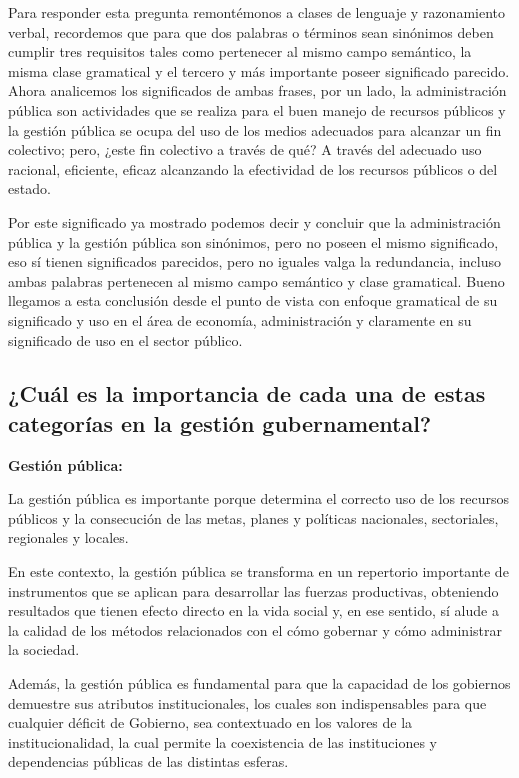 \documentclass[
  letterpaper,
  DIV=11,
  numbers=noendperiod]{scrartcl}
\begin{document}
Para responder esta pregunta remontémonos a clases de lenguaje y
razonamiento verbal, recordemos que para que dos palabras o términos
sean sinónimos deben cumplir tres requisitos tales como pertenecer al
mismo campo semántico, la misma clase gramatical y el tercero y más
importante poseer significado parecido. Ahora analicemos los
significados de ambas frases, por un lado, la administración pública son
actividades que se realiza para el buen manejo de recursos públicos y la
gestión pública se ocupa del uso de los medios adecuados para alcanzar
un fin colectivo; pero, ¿este fin colectivo a través de qué? A través
del adecuado uso racional, eficiente, eficaz alcanzando la efectividad
de los recursos públicos o del estado.

Por este significado ya mostrado podemos decir y concluir que la
administración pública y la gestión pública son sinónimos, pero no
poseen el mismo significado, eso sí tienen significados parecidos, pero
no iguales valga la redundancia, incluso ambas palabras pertenecen al
mismo campo semántico y clase gramatical. Bueno llegamos a esta
conclusión desde el punto de vista con enfoque gramatical de su
significado y uso en el área de economía, administración y claramente en
su significado de uso en el sector público.

\hypertarget{cuuxe1l-es-la-importancia-de-cada-una-de-estas-categoruxedas-en-la-gestiuxf3n-gubernamental}{%
\subsection{¿Cuál es la importancia de cada una de estas categorías en
la gestión
gubernamental?}\label{cuuxe1l-es-la-importancia-de-cada-una-de-estas-categoruxedas-en-la-gestiuxf3n-gubernamental}}

\textbf{Gestión pública:}

La gestión pública es importante porque determina el correcto uso de los
recursos públicos y la consecución de las metas, planes y políticas
nacionales, sectoriales, regionales y locales.

En este contexto, la gestión pública se transforma en un repertorio
importante de instrumentos que se aplican para desarrollar las fuerzas
productivas, obteniendo resultados que tienen efecto directo en la vida
social y, en ese sentido, sí alude a la calidad de los métodos
relacionados con el cómo gobernar y cómo administrar la sociedad.

Además, la gestión pública es fundamental para que la capacidad de los
gobiernos demuestre sus atributos institucionales, los cuales son
indispensables para que cualquier déficit de Gobierno, sea contextuado
en los valores de la institucionalidad, la cual permite la coexistencia
de las instituciones y dependencias públicas de las distintas esferas.
\end{document}
